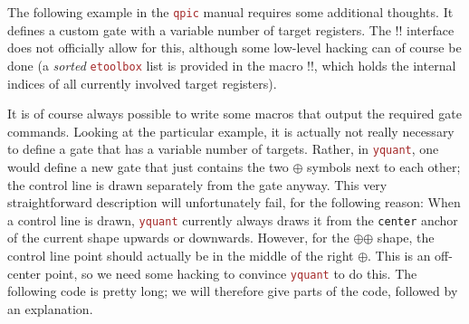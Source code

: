 \documentclass{scrartcl}
\def\pkg#1{\textcolor{brown}{\texttt{#1}}}
\def\Yquant{\pkg{yquant}}
\begin{document}
            \begin{example}
               The following example in the \pkg{qpic} manual requires some additional thoughts.
               It defines a custom gate with a variable number of target registers.
               The \tex!\yquantdefinegate! interface does not officially allow for this, although some low\hyp level hacking can of course be done (a \emph{sorted} \pkg{etoolbox} list is provided in the macro \tex!\yquant@circuit@subcircuit@param!, which holds the internal indices of all currently involved target registers).

               It is of course always possible to write some macros that output the required gate commands.
               Looking at the particular example, it is actually not really necessary to define a gate that has a variable number of targets.
               Rather, in \Yquant, one would define a new gate that just contains the two $\oplus$ symbols next to each other; the control line is drawn separately from the gate anyway.
               This very straightforward description will unfortunately fail, for the following reason:
               When a control line is drawn, \Yquant{} currently always draws it from the \texttt{center} anchor of the current shape upwards or downwards.
               However, for the $\mathord\oplus\!\mathord\oplus$ shape, the control line point should actually be in the middle of the right $\oplus$.
               This is an off\hyp center point, so we need some hacking to convince \Yquant{} to do this.
               The following code is pretty long; we will therefore give parts of the code, followed by an explanation.


\end{example}
\end{document}
